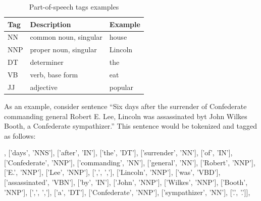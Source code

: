 \documentclass[12pt, twoside]{fithesis2}
\renewcommand{\_}{\leavevmode \kern0.07em\vbox{\hrule width0.4em}}
\begin{document}
\begin{table}[h]
\begin{center}
\begin{tabular}{| l | l | l |}
  \hline
  Tag & Description & Example \\
  \hline \hline
  NN & common noun, singular & house         \\ \hline
  NNP & proper noun, singular & Lincoln     \\ \hline
  DT & determiner & the \\ \hline
  VB & verb, base form & eat \\ \hline
  JJ & adjective & popular \\ \hline
\end{tabular}
\end{center}
\caption{Part-of-speech tags examples \cite{penn-tagset} }
\end{table}

As an example, consider sentence ``Six days after the surrender of Confederate commanding general Robert E. Lee, Lincoln was assassinated byt John Wilkes Booth, a Confederate sympathizer.'' This sentence would be tokenized and tagged as follows:
\begin{code}
[['Six', 'CD'], ['days', 'NNS'], ['after', 'IN'], ['the', 'DT'],
['surrender', 'NN'], ['of', 'IN'], ['Confederate', 'NNP'],
['commanding', 'NN'], ['general', 'NN'], ['Robert', 'NNP'],
['E.', 'NNP'], ['Lee', 'NNP'], [',', ','], ['Lincoln', 'NNP'],
['was', 'VBD'], ['assassinated', 'VBN'], ['by', 'IN'],
['John', 'NNP'], ['Wilkes', 'NNP'], ['Booth', 'NNP'],
[',', ','], ['a', 'DT'], ['Confederate', 'NNP'],
['sympathizer', 'NN'], ['.', '.']],
\end{code}
\end{document}
